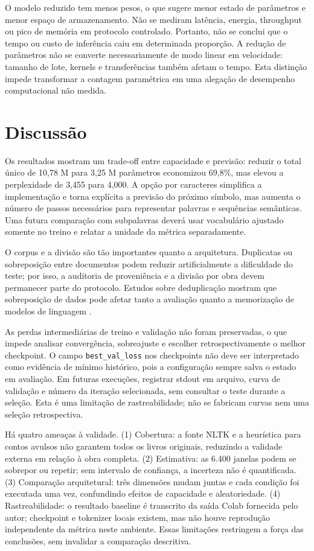 \documentclass[conference]{IEEEtran}
\begin{document}
O modelo reduzido tem menos pesos, o que sugere menor estado de parâmetros e menor espaço de armazenamento. Não se mediram latência, energia, throughput ou pico de memória em protocolo controlado. Portanto, não se conclui que o tempo ou custo de inferência caiu em determinada proporção. A redução de parâmetros não se converte necessariamente de modo linear em velocidade: tamanho de lote, kernels e transferências também afetam o tempo. Esta distinção impede transformar a contagem paramétrica em uma alegação de desempenho computacional não medida.

\section{Discussão}

Os resultados mostram um trade-off entre capacidade e previsão: reduzir o total único de 10,78 M para 3,25 M parâmetros economizou 69,8\%, mas elevou a perplexidade de 3,455 para 4,000. A opção por caracteres simplifica a implementação e torna explícita a previsão do próximo símbolo, mas aumenta o número de passos necessários para representar palavras e sequências semânticas. Uma futura comparação com subpalavras deverá usar vocabulário ajustado somente no treino e relatar a unidade da métrica separadamente.

O corpus e a divisão são tão importantes quanto a arquitetura. Duplicatas ou sobreposição entre documentos podem reduzir artificialmente a dificuldade do teste; por isso, a auditoria de proveniência e a divisão por obra devem permanecer parte do protocolo. Estudos sobre deduplicação mostram que sobreposição de dados pode afetar tanto a avaliação quanto a memorização de modelos de linguagem \cite{lee2022}.

As perdas intermediárias de treino e validação não foram preservadas, o que impede analisar convergência, sobreajuste e escolher retrospectivamente o melhor checkpoint. O campo \texttt{best\_val\_loss} nos checkpoints não deve ser interpretado como evidência de mínimo histórico, pois a configuração sempre salva o estado em avaliação. Em futuras execuções, registrar stdout em arquivo, curva de validação e número da iteração selecionada, sem consultar o teste durante a seleção. Esta é uma limitação de rastreabilidade; não se fabricam curvas nem uma seleção retrospectiva.

Há quatro ameaças à validade. (1) Cobertura: a fonte NLTK e a heurística para contos avulsos não garantem todos os livros originais, reduzindo a validade externa em relação à obra completa. (2) Estimativa: as 6.400 janelas podem se sobrepor ou repetir; sem intervalo de confiança, a incerteza não é quantificada. (3) Comparação arquitetural: três dimensões mudam juntas e cada condição foi executada uma vez, confundindo efeitos de capacidade e aleatoriedade. (4) Rastreabilidade: o resultado baseline é transcrito da saída Colab fornecida pelo autor; checkpoint e tokenizer locais existem, mas não houve reprodução independente da métrica neste ambiente. Essas limitações restringem a força das conclusões, sem invalidar a comparação descritiva.
\end{document}
